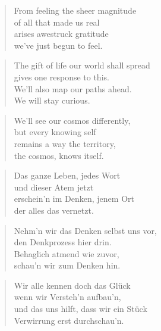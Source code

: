 \documentclass[10pt,a4paper]{article}
\begin{document}
\begin{paracol}{2}
\begin{verse}
From feeling the sheer magnitude\\
of all that made us real\\
arises awestruck gratitude\\
we’ve just begun to feel.
\end{verse}

\begin{verse}
The gift of life our world shall spread\\
gives one response to this.\\
We’ll also map our paths ahead.\\
We will stay curious.
\end{verse}

\begin{verse}
We’ll see our cosmos differently,\\
but every knowing self\\
remains a way the territory,\\
the cosmos, knows itself.
\end{verse}

\switchcolumn


\begin{verse}
Das ganze Leben, jedes Wort \\
und dieser Atem jetzt \\
erschein’n im Denken, jenem Ort \\
der alles das vernetzt. \\
\end{verse}

\begin{verse}
Nehm’n wir das Denken selbst uns vor, \\
den Denkprozess hier drin. \\
Behaglich atmend wie zuvor, \\
schau’n wir zum Denken hin. \\
\end{verse}

\begin{verse}
Wir alle kennen doch das Glück \\
wenn wir Versteh’n aufbau’n, \\
und das uns hilft, dass wir ein Stück \\
Verwirrung erst durchschau’n. \\
\end{verse}


\end{paracol}
\end{document}
